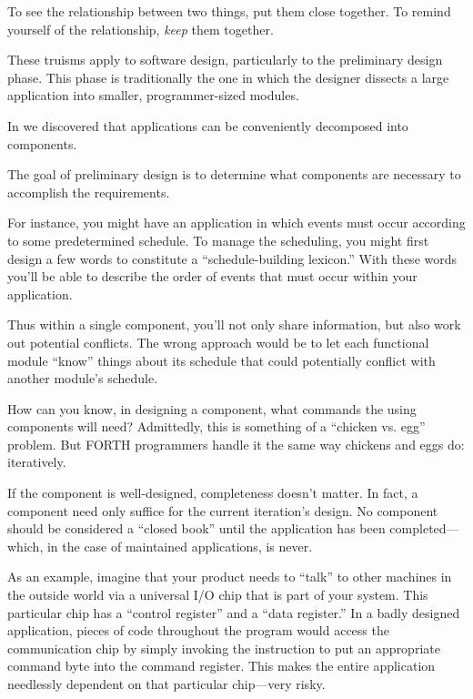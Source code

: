 \begin{tip}
To see the relationship between two things, put them close
together. To remind yourself of the relationship, \emph{keep} them
together.
\end{tip}

These truisms apply to software design, particularly to the preliminary
design phase. This phase is traditionally the one in which the designer
dissects a large application into smaller, programmer-sized modules.

In  we discovered that applications can be
conveniently decomposed into components.

\begin{tip}
The goal of preliminary design is to determine what components are
necessary to accomplish the requirements.
\end{tip}

For instance, you might have an application in which events must occur
according to some predetermined schedule. To manage the scheduling,
you might first design a few words to constitute a ``schedule-building
lexicon.'' With these words you'll be able to describe the order of events
that must occur within your application.

Thus within a single component, you'll not only share information,
but also work out potential conflicts. The wrong approach would be to let
each functional module ``know'' things about its schedule that could
potentially conflict with another module's schedule.

How can you know, in designing a component, what commands the
using components will need? Admittedly, this is something of a ``chicken
vs. egg'' problem. But FORTH programmers handle it the same way
chickens and eggs do: iteratively.

If the component is well-designed, completeness doesn't matter. In
fact, a component need only suffice for the current iteration's design. No
component should be considered a ``closed book'' until the application
has been completed---which, in the case of maintained applications, is
never.

As an example, imagine that your product needs to ``talk'' to other
machines in the outside world via a universal I/O chip that is part of your
system. This particular chip has a ``control register'' and a ``data
register.'' In a badly designed application, pieces of code throughout the
program would access the communication chip by simply invoking the
 instruction to put an appropriate command byte into the command
register. This makes the entire application needlessly dependent on that
particular chip---very risky.

